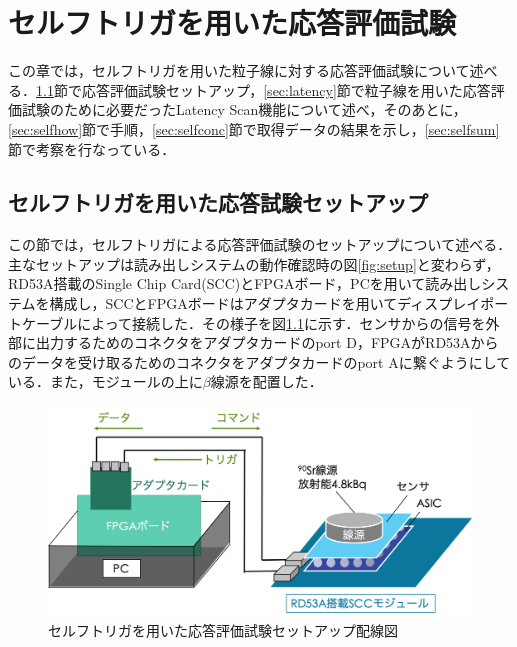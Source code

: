 \chapter{セルフトリガを用いた応答評価試験}
この章では，セルフトリガを用いた粒子線に対する応答評価試験について述べる．\ref{sec:selfsetup}節で応答評価試験セットアップ，\ref{sec:latency}節で粒子線を用いた応答評価試験のために必要だったLatency Scan機能について述べ，そのあとに，\ref{sec:selfhow}節で手順，\ref{sec:selfconc}節で取得データの結果を示し，\ref{sec:selfsum}節で考察を行なっている．

\section{セルフトリガを用いた応答試験セットアップ}
\label{sec:selfsetup}
この節では，セルフトリガによる応答評価試験のセットアップについて述べる．主なセットアップは読み出しシステムの動作確認時の図\ref{fig:setup}と変わらず，RD53A搭載のSingle Chip Card(SCC)とFPGAボード，PCを用いて読み出しシステムを構成し，SCCとFPGAボードはアダプタカードを用いてディスプレイポートケーブルによって接続した．その様子を図\ref{fig:selfsetup}に示す．センサからの信号を外部に出力するためのコネクタをアダプタカードのport D，FPGAがRD53Aからのデータを受け取るためのコネクタをアダプタカードのport Aに繋ぐようにしている．また，モジュールの上に$\beta$線源を配置した．

\begin{figure}[h]
  \centering
  \includegraphics[width=12cm]{./figure/selfsetupcab.png}
  \caption{セルフトリガを用いた応答評価試験セットアップ配線図}
  \label{fig:selfsetup}
\end{figure}

